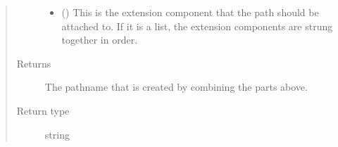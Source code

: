 \documentclass[letterpaper,10pt,english]{sphinxmanual}
\begin{document}
\begin{fulllineitems}
\begin{quote}
\begin{description}
\begin{itemize}
\item {} 
 (\sphinxstyleliteralemphasis{\sphinxupquote{ (}}\sphinxstyleliteralemphasis{\sphinxupquote{)}}) \textendash{} This is the extension component that the path should be
attached to. If it is a list, the extension components are
strung together in order.

\end{itemize}

\item[{Returns}] \leavevmode
{} \textendash{} The pathname that is created by combining the parts above.

\item[{Return type}] \leavevmode
string

\end{description}\end{quote}

\end{fulllineitems}

\end{document}
